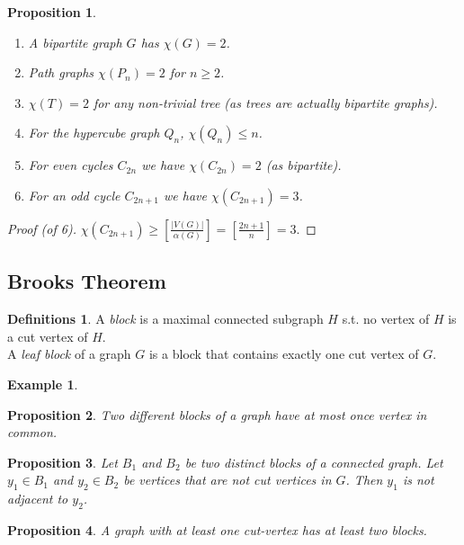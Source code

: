 \documentclass{article}
\newtheorem*{prop}{Proposition}
\theoremstyle{definition}
\newtheorem*{defns}{Definitions}
\newtheorem*{ex}{Example}
\begin{document}
\begin{prop}
\begin{enumerate}
\item A bipartite graph $G$ has $\chi(G) = 2$.
\item Path graphs $\chi(P_n) = 2$ for $n \ge 2$.
\item $\chi(T) = 2$ for any non-trivial tree (as trees are actually bipartite graphs).
\item For the hypercube graph $Q_n$, $\chi(Q_n) \le n$.
\item For even cycles $C_{2n}$ we have $\chi(C_{2n}) = 2$ (as bipartite).
\item For an odd cycle $C_{2n+1}$ we have $\chi(C_{2n+1}) = 3$.
\end{enumerate}
\end{prop}

\begin{proof}[Proof (of 6)]
$\chi(C_{2n+1}) \ge \left[ \frac{|V(G)|}{\alpha(G)}\right] = \left[\frac{2n+1}{n} \right] = 3$.
\end{proof}


\subsection{Brooks Theorem}

\begin{defns}
A \emph{block} is a maximal connected subgraph $H$ s.t. no vertex of $H$ is a cut vertex of $H$. \\
A \emph{leaf block} of a graph $G$ is a block that contains exactly one cut vertex of $G$.
\end{defns}

\begin{ex}
\end{ex}

\begin{prop}
Two different blocks of a graph have at most once vertex in common.
\end{prop}

\begin{prop}
Let $B_1$ and $B_2$ be two distinct blocks of a connected graph.
Let $y_1\in B_1$ and $y_2\in B_2$ be vertices that are not cut vertices in $G$.
Then $y_1$ is not adjacent to $y_2$.
\end{prop}

\begin{prop}
A graph with at least one cut-vertex has at least two blocks.
\end{prop}
\end{document}
